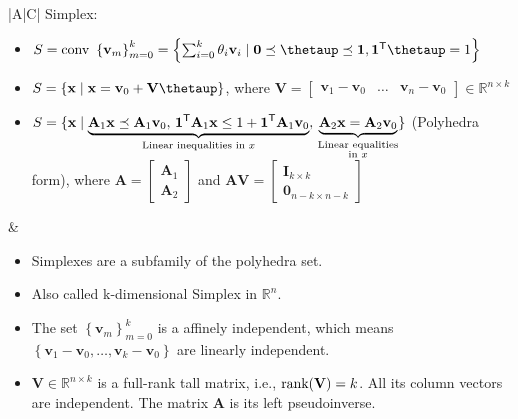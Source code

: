 \documentclass{article}
\newcommand{\trans}{\mathsf{T}}
\begin{document}
\begin{table}[ht!]
\begin{tabularx}{\textwidth}{|A|C|}
\hline
Simplex:
\begin{itemize}[leftmargin=*]
    \item \(S = \textnormal{conv }\left\{ \mathbf{v}_m \right\}_{m=0}^{k} = \left\{ \sum_{i=0}^{k} \theta_i \mathbf{v}_i \mid \mathbf{0} \preceq \boldsymbol{\thetaup} \preceq \mathbf{1}, \mathbf{1}^\trans \boldsymbol{\thetaup} = 1 \right\}\)
    \item \(S = \left\{ \mathbf{x} \mid \mathbf{x} = \mathbf{v}_0 + \mathbf{V} \boldsymbol{\thetaup} \right\}\), where \(\mathbf{V} = \begin{bmatrix}
        \mathbf{v}_1 - \mathbf{v}_0 & \dots & \mathbf{v}_n - \mathbf{v}_0
    \end{bmatrix} \in \mathbb{R}^{n \times k}\)
    \item \(S = \{ \mathbf{x} \mid \underbrace{\mathbf{A}_1 \mathbf{x} \preceq \mathbf{A}_1 \mathbf{v}_0, \, \mathbf{1}^\trans \mathbf{A}_1 \mathbf{x} \leq 1 + \mathbf{1}^\trans\mathbf{A}_1 \mathbf{v}_0}_{\textnormal{Linear inequalities in } x}, \, \underbrace{\mathbf{A}_2 \mathbf{x} = \mathbf{A}_2 \mathbf{v}_0}_{\substack{\text{\textnormal{Linear equalities}} \\\textnormal{in } x}} \}\) (Polyhedra form), where \(\mathbf{A} = \begin{bmatrix}
        \mathbf{A}_1 \\ \mathbf{A}_2
    \end{bmatrix}\) and \(\mathbf{AV} = \begin{bmatrix}
        \mathbf{I}_{k\times k}\\
        \mathbf{0}_{n-k \times n-k}
    \end{bmatrix}\)
\end{itemize} & \vspace{-3.5ex}
\begin{itemize}[leftmargin=*]
    \item Simplexes are a subfamily of the polyhedra set.
    \item Also called k-dimensional Simplex in \(\mathbb{R}^{n}\).
    \item The set \(\left\{ \mathbf{v}_m \right\}_{m=0}^{k}\) is a affinely independent, which means \(\left\{ \mathbf{v}_1-\mathbf{v}_0, \dots, \mathbf{v}_k-\mathbf{v}_0 \right\}\) are linearly independent.
    \item \(\mathbf{V} \in \mathbb{R}^{n\times k}\) is a full-rank tall matrix, i.e., \(\textnormal{rank}(\mathbf{V}) = k\). All its column vectors are independent. The matrix \(\mathbf{A}\) is its left pseudoinverse.

\end{itemize}
\end{tabularx}
\end{table}
\end{document}
